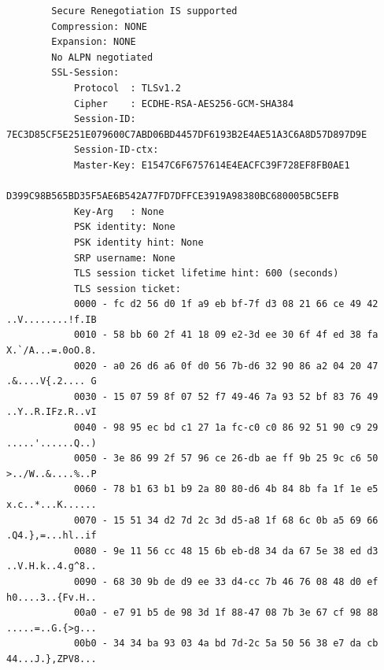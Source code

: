 \documentclass[10pt]{article}
\begin{document}
\begin{enumerate}
\begin{verbatim}
        Secure Renegotiation IS supported
        Compression: NONE
        Expansion: NONE
        No ALPN negotiated
        SSL-Session:
            Protocol  : TLSv1.2
            Cipher    : ECDHE-RSA-AES256-GCM-SHA384
            Session-ID: 7EC3D85CF5E251E079600C7ABD06BD4457DF6193B2E4AE51A3C6A8D57D897D9E
            Session-ID-ctx:
            Master-Key: E1547C6F6757614E4EACFC39F728EF8FB0AE1
            D399C98B565BD35F5AE6B542A77FD7DFFCE3919A98380BC680005BC5EFB
            Key-Arg   : None
            PSK identity: None
            PSK identity hint: None
            SRP username: None
            TLS session ticket lifetime hint: 600 (seconds)
            TLS session ticket:
            0000 - fc d2 56 d0 1f a9 eb bf-7f d3 08 21 66 ce 49 42   ..V........!f.IB
            0010 - 58 bb 60 2f 41 18 09 e2-3d ee 30 6f 4f ed 38 fa   X.`/A...=.0oO.8.
            0020 - a0 26 d6 a6 0f d0 56 7b-d6 32 90 86 a2 04 20 47   .&....V{.2.... G
            0030 - 15 07 59 8f 07 52 f7 49-46 7a 93 52 bf 83 76 49   ..Y..R.IFz.R..vI
            0040 - 98 95 ec bd c1 27 1a fc-c0 c0 86 92 51 90 c9 29   .....'......Q..)
            0050 - 3e 86 99 2f 57 96 ce 26-db ae ff 9b 25 9c c6 50   >../W..&....%..P
            0060 - 78 b1 63 b1 b9 2a 80 80-d6 4b 84 8b fa 1f 1e e5   x.c..*...K......
            0070 - 15 51 34 d2 7d 2c 3d d5-a8 1f 68 6c 0b a5 69 66   .Q4.},=...hl..if
            0080 - 9e 11 56 cc 48 15 6b eb-d8 34 da 67 5e 38 ed d3   ..V.H.k..4.g^8..
            0090 - 68 30 9b de d9 ee 33 d4-cc 7b 46 76 08 48 d0 ef   h0....3..{Fv.H..
            00a0 - e7 91 b5 de 98 3d 1f 88-47 08 7b 3e 67 cf 98 88   .....=..G.{>g...
            00b0 - 34 34 ba 93 03 4a bd 7d-2c 5a 50 56 38 e7 da cb   44...J.},ZPV8...


\end{verbatim}
\end{enumerate}
\end{document}
